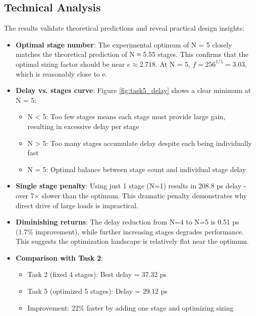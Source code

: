 \documentclass[UTF8,12pt,a4paper]{ctexart}
\begin{document}
\subsection{Technical Analysis}

The results validate theoretical predictions and reveal practical design insights:

\begin{itemize}
    \item \textbf{Optimal stage number}: The experimental optimum of N = 5 closely matches the theoretical prediction of N ≈ 5.55 stages. This confirms that the optimal sizing factor should be near $e \approx 2.718$. At N = 5, $f = 256^{1/5} = 3.03$, which is reasonably close to e.
    
    \item \textbf{Delay vs. stages curve}: Figure \ref{fig:task5_delay} shows a clear minimum at N = 5:
    \begin{itemize}
        \item N < 5: Too few stages means each stage must provide large gain, resulting in excessive delay per stage
        \item N > 5: Too many stages accumulate delay despite each being individually fast
        \item N = 5: Optimal balance between stage count and individual stage delay
    \end{itemize}
    
    \item \textbf{Single stage penalty}: Using just 1 stage (N=1) results in 208.8 ps delay - over 7× slower than the optimum. This dramatic penalty demonstrates why direct drive of large loads is impractical.
    
    \item \textbf{Diminishing returns}: The delay reduction from N=4 to N=5 is 0.51 ps (1.7\% improvement), while further increasing stages degrades performance. This suggests the optimization landscape is relatively flat near the optimum.
    
    \item \textbf{Comparison with Task 2}: 
    \begin{itemize}
        \item Task 2 (fixed 4 stages): Best delay = 37.32 ps
        \item Task 5 (optimized 5 stages): Delay = 29.12 ps
        \item Improvement: 22\% faster by adding one stage and optimizing sizing
    \end{itemize}
    

\end{itemize}
\end{document}
